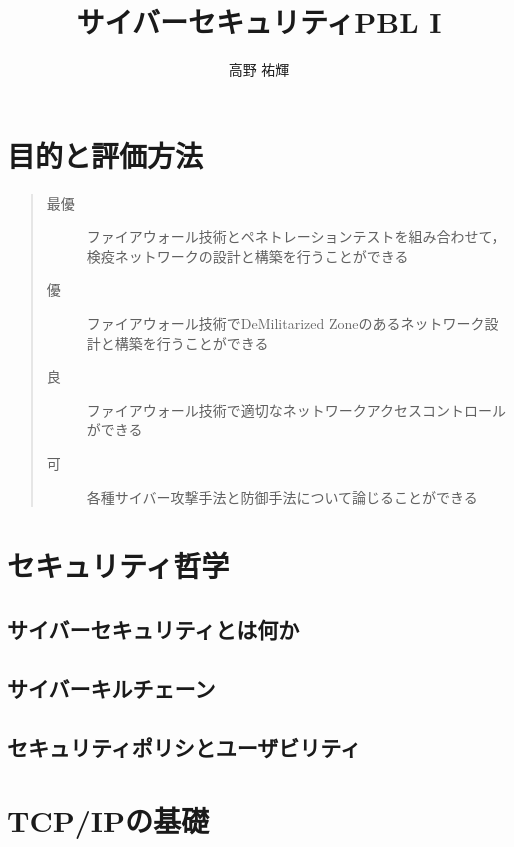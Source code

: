 \documentclass[fleqn]{jsarticle}
\title{サイバーセキュリティPBL I}
\author{高野 祐輝}
\begin{document}
\maketitle

\tableofcontents

\section{目的と評価方法}

\begin{quote}
\begin{description}
    \item[最優] ファイアウォール技術とペネトレーションテストを組み合わせて，検疫ネットワークの設計と構築を行うことができる
    \item[優] ファイアウォール技術でDeMilitarized Zoneのあるネットワーク設計と構築を行うことができる
    \item[良] ファイアウォール技術で適切なネットワークアクセスコントロールができる
    \item[可] 各種サイバー攻撃手法と防御手法について論じることができる
\end{description}
\end{quote}


\section{セキュリティ哲学}

\subsection{サイバーセキュリティとは何か}

\subsection{サイバーキルチェーン}

\cite{hutchins2011intelligence}

\subsection{セキュリティポリシとユーザビリティ}

\cite{RFC2196}

\section{TCP/IPの基礎} \label{sec:tcpip}

\end{document}
